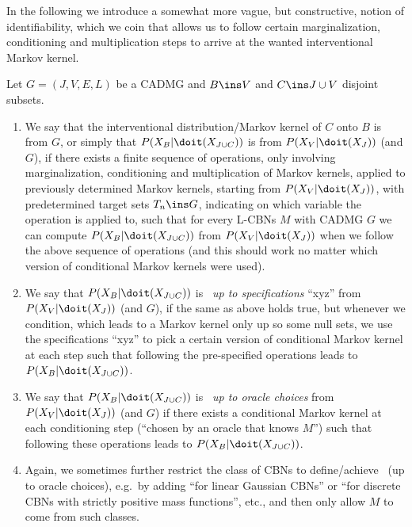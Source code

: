In the following we introduce a somewhat more vague, but constructive, notion of identifiability, which we coin \emph{\trackability} that allows us to follow certain marginalization, conditioning and multiplication steps to arrive at the wanted interventional Markov kernel.

\begin{Def}
    Let $G=(J,V,E,L)$ be a CADMG and $B \ins V$ and $C \ins J \cup V$ disjoint subsets.
    \begin{enumerate}
        \item We say that the interventional distribution/Markov kernel of $C$ onto $B$ is \emph{\trackable} from $G$,
            or simply that $P(X_B|\doit(X_{J \cup C}))$ is \emph{\trackable} from $P(X_V|\doit(X_J))$ (and $G$),
    if there exists a finite sequence of operations, only involving marginalization, conditioning and multiplication of Markov kernels,
    applied to previously determined Markov kernels, starting from $P(X_V|\doit(X_J))$, with predetermined target sets $T_n \ins G$,
    indicating on which variable the operation is applied to, such that for every L-CBNs $M$ with \observational CADMG $G$ 
    we can compute $P(X_B|\doit(X_{J \cup C}))$ from $P(X_V|\doit(X_J))$ when we follow the above sequence of operations (and this should work no matter which version of conditional Markov kernels were used).
\item We say that $P(X_B|\doit(X_{J \cup C}))$ is \emph{\trackable\ up to specifications} ``xyz'' from $P(X_V|\doit(X_J))$ (and $G$), if the same as above holds true, but whenever we condition,  which leads to a Markov kernel only up so some null sets, we use the specifications ``xyz'' to pick a certain version of conditional Markov kernel at each step such that following the pre-specified operations leads to $P(X_B|\doit(X_{J \cup C}))$. 
\item We say that $P(X_B|\doit(X_{J \cup C}))$ is \emph{\trackable\ up to oracle choices} from $P(X_V|\doit(X_J))$ (and $G$) if there exists a conditional Markov kernel at each conditioning step (``chosen by an oracle that knows $M$'') 
    such that following these operations leads to $P(X_B|\doit(X_{J \cup C}))$. 
\item    Again, we sometimes further restrict the class of CBNs to define/achieve \trackability\ (up to oracle choices), 
    e.g.\ by adding ``for linear Gaussian CBNs'' or ``for discrete CBNs with strictly positive mass functions'', etc., 
    and then only allow $M$ to come from such classes.
    \end{enumerate}
\end{Def}


